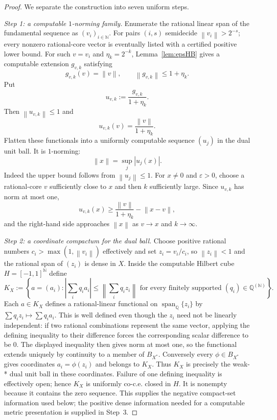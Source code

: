 \documentclass[11pt]{article}
\theoremstyle{definition}
\newcommand{\norm}[1]{\left\lVert #1 \right\rVert}
\newcommand{\abs}[1]{\left\lvert #1 \right\rvert}
\newcommand{\N}{\mathbb{N}}
\newcommand{\Q}{\mathbb{Q}}
\begin{document}
\begin{proof}
We separate the construction into seven uniform steps.

\smallskip
\noindent\emph{Step 1: a computable $1$-norming family.}
Enumerate the rational linear span of the fundamental sequence as $(v_i)_{i\in\N}$.
For pairs $(i,s)$ semidecide $\norm{v_i}>2^{-s}$; every nonzero rational-core vector is
eventually listed with a certified positive lower bound.  For such $v=v_i$ and
$\eta_k=2^{-k}$, Lemma~\ref{lem:epsHB} gives a computable extension $g_{v,k}$ satisfying
\[
 g_{v,k}(v)=\norm v,
 \qquad \norm{g_{v,k}}\le1+\eta_k.
\]
Put
\[
 u_{v,k}:=\frac{g_{v,k}}{1+\eta_k}.
\]
Then $\norm{u_{v,k}}\le1$ and
\[
 u_{v,k}(v)=\frac{\norm v}{1+\eta_k}.
\]
Flatten these functionals into a uniformly computable sequence $(u_j)$ in the dual unit
ball.  It is $1$-norming:
\[
 \norm x=\sup_j\abs{u_j(x)}.
\]
Indeed the upper bound follows from $\norm{u_j}\le1$.  For $x\ne0$ and $\varepsilon>0$,
choose a rational-core $v$ sufficiently close to $x$ and then $k$ sufficiently large.
Since $u_{v,k}$ has norm at most one,
\[
 u_{v,k}(x)
 \ge \frac{\norm v}{1+\eta_k}-\norm{x-v},
\]
and the right-hand side approaches $\norm x$ as $v\to x$ and $k\to\infty$.

\smallskip
\noindent\emph{Step 2: a coordinate compactum for the dual ball.}
Choose positive rational numbers $c_i>\max(1,\norm{v_i})$ effectively and set
$z_i=v_i/c_i$, so $\norm{z_i}<1$ and the rational span of $(z_i)$ is dense in $X$.
Inside the computable Hilbert cube $H=[-1,1]^{\N}$ define
\[
 K_X:=\left\{a=(a_i):
 \abs{\sum_i q_i a_i}\le
 \norm{\sum_i q_i z_i}
 \text{ for every finitely supported }(q_i)\in\Q^{(\N)}
 \right\}.
\]
Each $a\in K_X$ defines a rational-linear functional on
$\operatorname{span}_{\Q}\{z_i\}$ by $\sum q_i z_i\mapsto\sum q_i a_i$.  This is
well defined even though the $z_i$ need not be linearly independent: if two rational
combinations represent the same vector, applying the defining inequality to their
difference forces the corresponding scalar difference to be $0$.  The displayed inequality
then gives norm at most one, so the functional extends uniquely by continuity to a member
of $B_{X^*}$.  Conversely every $\phi\in B_{X^*}$ gives coordinates
$a_i=\phi(z_i)$ and belongs to $K_X$.  Thus $K_X$ is precisely the weak-* dual unit ball
in these coordinates.  Failure of one defining inequality is effectively open; hence
$K_X$ is uniformly co-c.e. closed in $H$.  It is nonempty because it contains the zero
sequence.  This supplies the negative compact-set information used below; the positive
dense information needed for a computable metric presentation is supplied in Step~3.


\end{proof}
\end{document}
